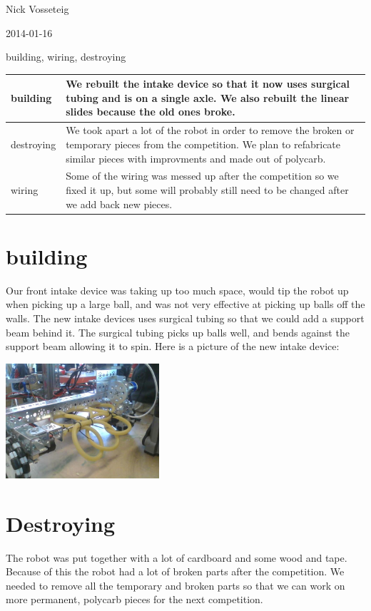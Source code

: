 Nick Vosseteig

2014-01-16

building, wiring, destroying

\begin{tabular}{|p{5cm}|p{5cm}|}
 \hline
 building&
We rebuilt the intake device so that it now uses surgical tubing and is on a single axle. We also rebuilt the linear slides because the old ones broke.
 \\
 \hline
destroying&
We took apart a lot of the robot in order to remove the broken or temporary pieces from the competition. We plan to refabricate similar pieces with improvments and made out of polycarb.
 \\
 \hline
wiring&
Some of the wiring was messed up after the competition so we fixed it up, but some will probably still need to be changed after we add back new pieces.
 \\
 \hline
\end{tabular}

\section*{building}
Our front intake device was taking up too much space, would tip the robot up when picking up a large ball, and was not very effective at picking up balls off the walls. The new intake devices uses surgical tubing so that we could add a support beam behind it. The surgical tubing picks up balls well, and bends against the support beam allowing it to spin. Here is a picture of the new intake device:

\begin{center}
 \includegraphics[width=215px]{./Entries/Images/new_intake.jpg}
\end{center}

\section*{Destroying}
The robot was put together with a lot of cardboard and some wood and tape. Because of this the robot had a lot of broken parts after the competition. We needed to remove all the temporary and broken parts so that we can work on more permanent, polycarb pieces for the next competition.
